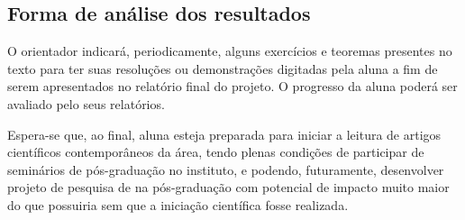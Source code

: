 \documentclass{article}
\begin{document}
    \subsection{Forma de análise dos resultados}
    O orientador indicará, periodicamente, alguns exercícios e teoremas presentes no texto para ter suas resoluções ou demonstrações digitadas pela aluna a fim de serem apresentados no relatório final do projeto. O progresso da aluna poderá ser avaliado pelo seus relatórios.

    Espera-se que, ao final, aluna esteja preparada para iniciar a leitura de artigos científicos contemporâneos da área, tendo plenas condições de participar de seminários de pós-graduação no instituto, e podendo, futuramente, desenvolver projeto de pesquisa de na pós-graduação com potencial de impacto muito maior do que possuiria sem que a iniciação científica fosse realizada.


\end{document}
